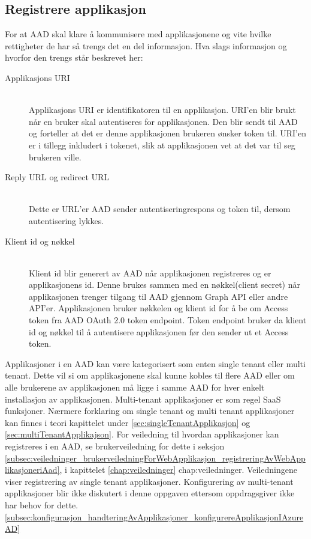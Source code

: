 \subsection{Registrere applikasjon}
\label{subsec:konfigurasjon_handteringAvApplikasjoner_leggTilApplikasjonIAzureAD}
For at AAD skal klare å kommunisere med applikasjonene og vite hvilke rettigheter de har så trengs det en del informasjon. Hva slags informasjon og hvorfor den trengs \cite{RegistrereApplikasjoneriAAD} står beskrevet her:
\bigskip
\begin{description}
    \item [Applikasjons URI] \hfill \\ 
    Applikasjons URI er identifikatoren til en applikasjon. URI'en blir brukt når en bruker skal autentiseres for applikasjonen. Den blir sendt til AAD og forteller at det er denne applikasjonen brukeren ønsker token til. URI'en er i tillegg inkludert i tokenet, slik at applikasjonen vet at det var til seg brukeren ville. 
    \bigskip
    \item [Reply URL og redirect URL] \hfill \\
    Dette er URL'er AAD sender autentiseringrespons og token til, dersom autentisering lykkes. 
    \bigskip
    \item[Klient id og nøkkel] \hfill \\
    Klient id blir generert av AAD når applikasjonen registreres og er applikasjonens id. Denne brukes sammen med en nøkkel(client secret) når applikasjonen trenger tilgang til AAD gjennom Graph API eller andre API'er. Applikasjonen bruker nøkkelen og klient id for å be om Access token fra AAD OAuth 2.0 token endpoint. Token endpoint bruker da klient id og nøkkel til å autentisere applikasjonen før den sender ut et Access token.
\end{description} 
\bigskip

Applikasjoner i en AAD kan være kategorisert som enten single tenant eller multi tenant. Dette vil si om applikasjonene skal kunne kobles til flere AAD eller om alle brukerene av applikasjonen må ligge i samme AAD for hver enkelt installasjon av applikasjonen. Multi-tenant applikasjoner er som regel SaaS funksjoner. Nærmere forklaring om single tenant og multi tenant applikasjoner kan finnes i teori kapittelet under \ref{sec:singleTenantApplikasjon} og \ref{sec:multiTenantApplikajson}. For veiledning til hvordan applikasjoner kan registreres i en AAD, se brukerveiledning for dette i seksjon \ref{subsec:veiledninger_brukerveiledningForWebApplikasjon_registreringAvWebApplikasjoneriAad}, i kapittelet \ref{chap:veiledninger} \refname{chap:veiledninger}. Veiledningene viser registrering av single tenant applikasjoner. Konfigurering av multi-tenant applikasjoner blir ikke diskutert i denne oppgaven ettersom oppdragsgiver ikke har behov for dette. \ref{subsec:konfigurasjon_handteringAvApplikasjoner_konfigurereApplikasjonIAzureAD} \\

